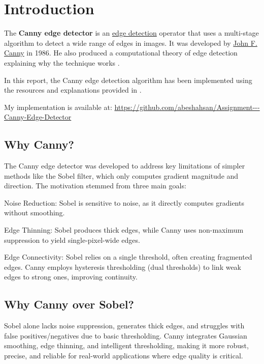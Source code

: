 \section{Introduction}
\label{sec:introduction}

The \textbf{Canny edge detector} is an \href{https://en.wikipedia.org/wiki/Edge_detection}{edge detection} operator that uses a multi-stage algorithm to detect a wide range of edges in images. It was developed by \href{https://en.wikipedia.org/wiki/John_F._Canny}{John F. Canny} in 1986. He also produced a computational theory of edge detection explaining why the technique works \cite{wikipedia_canny}.

In this report, the Canny edge detection algorithm has been implemented using the resources and explanations provided in \cite{gonzalez2008, medium_canny, sriram_canny, wikipedia_canny}. 

My implementation is available at: \url{https://github.com/abeshahsan/Assignment---Canny-Edge-Detector}

\subsection{Why Canny?}
\label{sec:why-canny}
The Canny edge detector was developed to address key limitations of simpler methods like the Sobel filter, which only computes gradient magnitude and direction. The motivation stemmed from three main goals:

Noise Reduction: Sobel is sensitive to noise, as it directly computes gradients without smoothing.

Edge Thinning: Sobel produces thick edges, while Canny uses non-maximum suppression to yield single-pixel-wide edges.

Edge Connectivity: Sobel relies on a single threshold, often creating fragmented edges. Canny employs hysteresis thresholding (dual thresholds) to link weak edges to strong ones, improving continuity.

\subsection{Why Canny over Sobel?}
\label{sec:why-canny-over-sobel}

Sobel alone lacks noise suppression, generates thick edges, and struggles with false positives/negatives due to basic thresholding. Canny integrates Gaussian smoothing, edge thinning, and intelligent thresholding, making it more robust, precise, and reliable for real-world applications where edge quality is critical.


